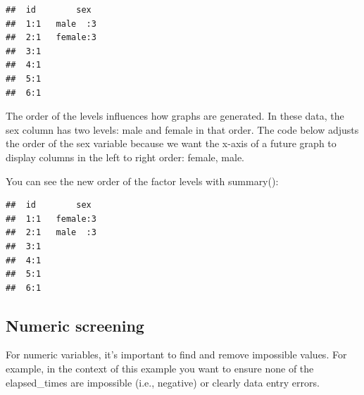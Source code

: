 \documentclass[
]{krantz}
\makeatletter
\newenvironment{Shaded}{\begin{snugshade}}{\end{snugshade}}
\newcommand{\DataTypeTok}[1]{\textcolor[rgb]{0.27,0.27,0.27}{#1}}
\newcommand{\KeywordTok}[1]{\textcolor[rgb]{0.27,0.27,0.27}{\textbf{#1}}}
\newcommand{\NormalTok}[1]{#1}
\newcommand{\OperatorTok}[1]{\textcolor[rgb]{0.43,0.43,0.43}{\textbf{#1}}}
\newcommand{\StringTok}[1]{\textcolor[rgb]{0.5,0.5,0.5}{#1}}
\newenvironment{kframe}{%
\medskip{}
\setlength{\fboxsep}{.8em}
 \def\at@end@of@kframe{}%
 \ifinner\ifhmode%
  \def\at@end@of@kframe{\end{minipage}}%
  \begin{minipage}{\columnwidth}%
 \fi\fi%
 \def\FrameCommand##1{\hskip\@totalleftmargin \hskip-\fboxsep
 \colorbox{shadecolor}{##1}\hskip-\fboxsep
     \hskip-\linewidth \hskip-\@totalleftmargin \hskip\columnwidth}%
 \MakeFramed {\advance\hsize-\width
   \@totalleftmargin\z@ \linewidth\hsize
   \@setminipage}}%
 {\par\unskip\endMakeFramed%
 \at@end@of@kframe}
\renewenvironment{Shaded}{\begin{kframe}}{\end{kframe}}
\makeatother
\begin{document}
\begin{verbatim}
##  id        sex   
##  1:1   male  :3  
##  2:1   female:3  
##  3:1             
##  4:1             
##  5:1             
##  6:1
\end{verbatim}

The order of the levels influences how graphs are generated. In these data, the sex column has two levels: male and female in that order. The code below adjusts the order of the sex variable because we want the x-axis of a future graph to display columns in the left to right order: female, male.

\begin{Shaded}
\end{Shaded}

You can see the new order of the factor levels with summary():

\begin{Shaded}
\end{Shaded}

\begin{verbatim}
##  id        sex   
##  1:1   female:3  
##  2:1   male  :3  
##  3:1             
##  4:1             
##  5:1             
##  6:1
\end{verbatim}

\hypertarget{numeric-screening-1}{%
\subsection{Numeric screening}\label{numeric-screening-1}}

For numeric variables, it's important to find and remove impossible values. For example, in the context of this example you want to ensure none of the elapsed\_times are impossible (i.e., negative) or clearly data entry errors.
\end{document}
